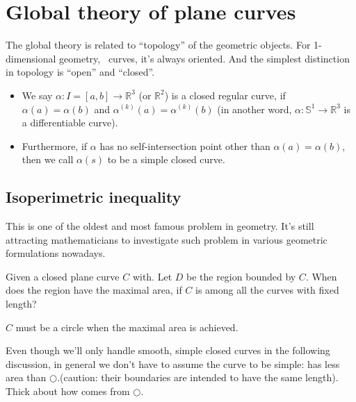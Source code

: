 \section{Global theory of plane curves}

The global theory is related to ``topology'' of the geometric objects.
For 1-dimensional geometry, \ie\ curves, it's always oriented. And the simplest distinction in topology
is ``open'' and ``closed''.

\begin{definition}
    \begin{itemize}\hfill
        \item We say
              \(\alpha\colon I=[a,b]\to \mathbb{R}
              ^3\)
              (or \(\mathbb{R}^2\))
              is a closed regular curve, if
              \(\alpha(a)=\alpha(b)\)
              and
              \(\alpha^{(k)}
              (a)=\alpha^{(k)}(b)\)
              (in another word,
              \(\alpha\colon \mathbb{S}^1\to \mathbb{R}^3\)
              is a differentiable curve).
        \item Furthermore, if
              \(\alpha\)
              has no
              self-intersection point other than
              $\alpha(a)=\alpha(b)$,
              then we call $\alpha(s)$ to be a simple closed curve.
    \end{itemize}
\end{definition}
\begin{center}
\end{center}

\subsection{Isoperimetric inequality}
This is one of the oldest and most famous problem in geometry. It's still attracting mathematicians to investigate such problem in various geometric formulations nowadays.
\begin{question}
    Given a closed plane curve \(C\) with. Let \(D\) be the
    region bounded by \(C\). When does the region have the
    maximal area, if \(C\) is among all the curves with
    fixed length?
\end{question}
\begin{answer}
    \(C\) must be a circle when the maximal area is
    achieved.
\end{answer}
\begin{remark}
    Even though we'll only handle smooth, simple closed
    curves in the following discussion, in general we
    don't have to assume the curve to be simple:
    {\ooalign{$\bigcirc $\cr $\ \ \,\bigcirc $}}
    has less area than $\bigcirc $.(caution: their boundaries are intended to have the same length). Thick about how
        {\ooalign{$\bigcirc $\cr $\ \ \,\bigcirc $}}
    comes from $\bigcirc $.
\end{remark}

